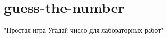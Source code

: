 \chapter{guess-\/the-\/number}
\hypertarget{md__r_e_a_d_m_e}{}\label{md__r_e_a_d_m_e}
\label{md__r_e_a_d_m_e_autotoc_md0}%
%


"{}Простая игра \textquotesingle{}Угадай число\textquotesingle{} для лабораторных работ"{} 